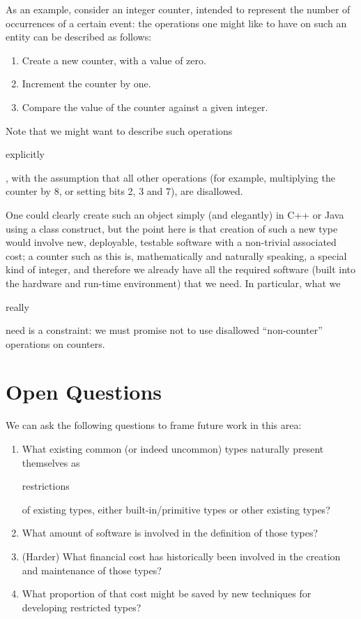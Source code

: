 \documentclass{eceasst}
\begin{document}
As an example, consider an integer counter, intended to represent the
number of occurrences of a certain event: the operations one might like to have
on such an entity can be described as follows:

\begin{enumerate}
\item Create a new counter, with a value of zero.
\item Increment the counter by one.
\item Compare the value of the counter against a given integer.
\end{enumerate}

Note that we might want to describe such operations
\begin{em}explicitly\end{em}, with the assumption that all other
operations (for example, multiplying the counter by 8, or setting bits 2,
3 and 7), are disallowed.

One could clearly create such an object simply (and elegantly) in C++
or Java using a class construct, but the point here is that
creation of such a new type would involve new, deployable, testable
software with a non-trivial associated cost; a counter such as this is,
mathematically and naturally speaking, a special kind of integer, and
therefore we already have all the required software (built into the 
hardware and run-time environment) that we need. In particular, what
we \begin{em}really\end{em} need is a constraint: we must promise not
to use disallowed ``non-counter'' operations on counters.

\section{Open Questions}

We can ask the following questions to frame future work in this area:

\begin{enumerate}
\item What existing common (or indeed uncommon) types naturally present
themselves as \begin{em}restrictions\end{em} of existing types, either
built-in/primitive types or other existing types?
\item What amount of software is involved in the definition of those types?
\item (Harder) What financial cost has historically been involved in
the creation and maintenance of those types?
\item What proportion of that cost might be saved by new techniques for
developing restricted types?
\end{enumerate}



%
%
\end{document}
